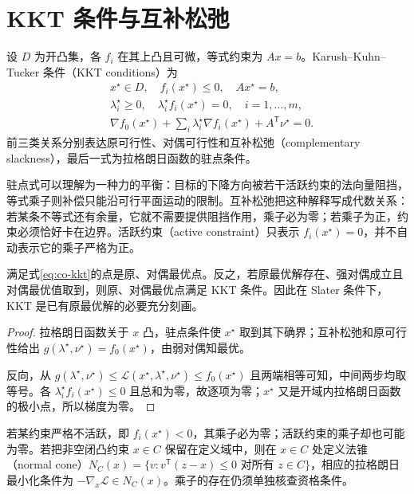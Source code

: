 \section{KKT 条件与互补松弛}

设 $D$ 为开凸集，各 $f_i$ 在其上凸且可微，等式约束为 $Ax=b$。Karush--Kuhn--Tucker 条件（KKT conditions）为
\begin{equation}
 \begin{aligned}
 &x^\star\in D,\quad f_i(x^\star)\leq0,\quad Ax^\star=b,\\
 &\lambda_i^\star\geq0,\quad\lambda_i^\star f_i(x^\star)=0,\quad i=1,\ldots,m,\\
 &\nabla f_0(x^\star)+\sum_i\lambda_i^\star\nabla f_i(x^\star)
    +A^{\mathsf T}\nu^\star=0.
 \end{aligned}
 \label{eq:co-kkt}
\end{equation}
前三类关系分别表达原可行性、对偶可行性和互补松弛（complementary slackness），最后一式为拉格朗日函数的驻点条件。

驻点式可以理解为一种力的平衡：目标的下降方向被若干活跃约束的法向量阻挡，等式乘子则补偿只能沿可行平面运动的限制。互补松弛把这种解释写成代数关系：若某条不等式还有余量，它就不需要提供阻挡作用，乘子必为零；若乘子为正，约束必须恰好卡在边界。活跃约束（active constraint）只表示 $f_i(x^\star)=0$，并不自动表示它的乘子严格为正。

\begin{theorem}
满足式\eqref{eq:co-kkt}的点是原、对偶最优点。反之，若原最优解存在、强对偶成立且对偶最优值取到，则原、对偶最优点满足 KKT 条件。因此在 Slater 条件下，KKT 是已有原最优解的必要充分刻画。
\end{theorem}
\begin{proof}
拉格朗日函数关于 $x$ 凸，驻点条件使 $x^\star$ 取到其下确界；互补松弛和原可行性给出 $g(\lambda^\star,\nu^\star)=f_0(x^\star)$，由弱对偶知最优。

反向，从 $g(\lambda^\star,\nu^\star)\leq\mathcal L(x^\star,\lambda^\star,\nu^\star)\leq f_0(x^\star)$ 且两端相等可知，中间两步均取等号。各 $\lambda_i^\star f_i(x^\star)\leq0$ 且总和为零，故逐项为零；$x^\star$ 又是开域内拉格朗日函数的极小点，所以梯度为零。
\end{proof}

若某约束严格不活跃，即 $f_i(x^\star)<0$，其乘子必为零；活跃约束的乘子却也可能为零。若把非空闭凸约束 $x\in C$ 保留在定义域中，则在 $x\in C$ 处定义法锥（normal cone）$N_C(x)=\{v:v^{\mathsf T}(z-x)\leq0\text{ 对所有 }z\in C\}$，相应的拉格朗日最小化条件为 $-\nabla_x\mathcal L\in N_C(x)$。乘子的存在仍须单独核查资格条件。

